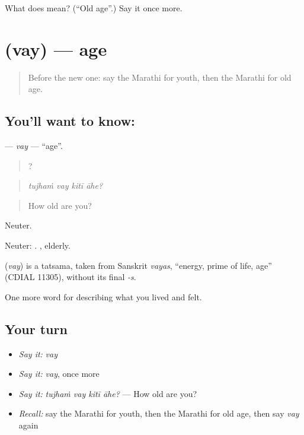 \begin{tcolorbox}[breakable,colback=teal!4,colframe=teal!35!black,title={Before you move on}]
What does  mean? (\textquotedblleft{}Old age\textquotedblright{}.) Say it once more.
\end{tcolorbox}
\section[\texorpdfstring{\mr{वय} (vay)}{वय (vay)}]{ (vay) — age}

\label{lesson:MR-C498-vay}



\begin{quote}
Before the new one: say the Marathi for youth, then the Marathi for old age.
\end{quote}

\subsection*{You'll want to know: }
\textbf{} — \emph{vay} — \textquotedblleft{}age\textquotedblright{}.

\begin{quote}
   ?
\end{quote}

\begin{quote}
\emph{tujhaṁ vay kitī āhe?}
\end{quote}

\begin{quote}
How old are you?
\end{quote}

Neuter.

Neuter:     . , elderly.

\begin{cousinweb}
\textbf{} (\emph{vay}) is a tatsama, taken from Sanskrit \emph{vayas}, \textquotedblleft{}energy, prime of life, age\textquotedblright{} (CDIAL 11305), without its final \emph{-s}.
\end{cousinweb}

\begin{grammarlens}[title={What you've built}]
One more word for describing what you lived and felt.
\end{grammarlens}

\subsection*{Your turn}
\begin{itemize}
\raggedright
  \item \emph{Say it:} \emph{vay}
  \item \emph{Say it:} \emph{vay}, once more
  \item \emph{Say it:} \emph{tujhaṁ vay kitī āhe?} — How old are you?
  \item \emph{Recall:} say the Marathi for youth, then the Marathi for old age, then say \emph{vay} again
\end{itemize}

